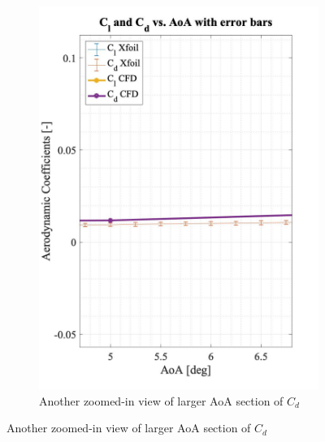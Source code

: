 \begin{figure}[H]
\begin{subfigure}[b]{0.5\textwidth}
    \includegraphics[width=\textwidth]{error_bar3.jpg}
    \caption{Another zoomed-in view of larger AoA section of $C_d$}
    \label{fig:error_bar3}
  \end{subfigure}
\end{figure}
